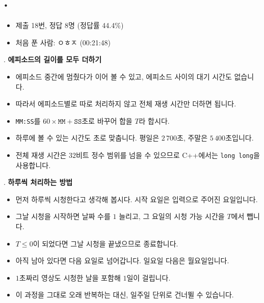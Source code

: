 
\section{\texorpdfstring{\pletter. \ptitle}{문제 \pletter}}

\begin{frame}[label=problem-H]
    \sectiontitle{\pletter}{\ptitle}
    \begin{itemize}
        \item 제출 18번, 정답 8명 (정답률 44.4\%)
        \item 처음 푼 사람: ㅇㅎㅈ (00:21:48)
    \end{itemize}
\end{frame}

\begin{frame}{\textbf{\pletter}. \ptitle}
    \textbf{에피소드의 길이를 모두 더하기}
\begin{itemize}
        \item 에피소드 중간에 멈췄다가 이어 볼 수 있고, 에피소드 사이의 대기 시간도 없습니다.
        \item 따라서 에피소드별로 따로 처리하지 않고 전체 재생 시간만 더하면 됩니다.
        \item \texttt{MM:SS}를 $60\times\texttt{MM}+\texttt{SS}$초로 바꾸어 합을 $T$라 합시다.
        \item 하루에 볼 수 있는 시간도 초로 맞춥니다. 평일은 $2\,700$초, 주말은 $5\,400$초입니다.
        \item 전체 재생 시간은 $32$비트 정수 범위를 넘을 수 있으므로 \mbox{C++}에서는 \texttt{long long}을 사용합니다.
    \end{itemize}
\end{frame}

\begin{frame}{\textbf{\pletter}. \ptitle}
    \textbf{하루씩 처리하는 방법}
\begin{itemize}
        \item 먼저 하루씩 시청한다고 생각해 봅시다. 시작 요일은 입력으로 주어진 요일입니다.
        \item 그날 시청을 시작하면 날짜 수를 $1$ 늘리고, 그 요일의 시청 가능 시간을 $T$에서 뺍니다.
        \item $T\le0$이 되었다면 그날 시청을 끝냈으므로 종료합니다.
        \item 아직 남아 있다면 다음 요일로 넘어갑니다. 일요일 다음은 월요일입니다.
        \item $1$초짜리 영상도 시청한 날을 포함해 $1$일이 걸립니다.
        \item 이 과정을 그대로 오래 반복하는 대신, 일주일 단위로 건너뛸 수 있습니다.
    \end{itemize}
\end{frame}

